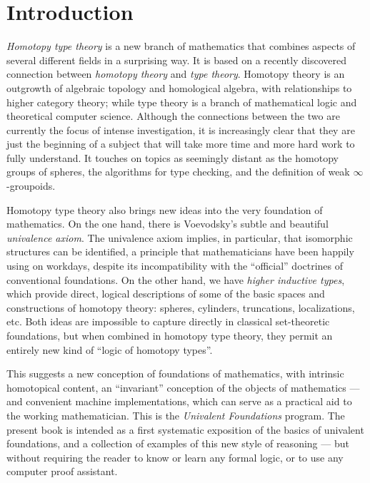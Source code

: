 \chapter*{Introduction}
\setcounter{page}{1}


\emph{Homotopy type theory} is a new branch of mathematics that combines aspects of several different fields in a surprising way. It is based on a recently discovered connection between \emph{homotopy theory} and \emph{type theory}.
Homotopy theory is an outgrowth of algebraic topology and homological algebra, with relationships to higher category theory; while type theory is a branch of mathematical logic and theoretical computer science.
Although the connections between the two are currently the focus of intense investigation, it is increasingly clear that they are just the beginning of a subject that will take more time and more hard work to fully understand.
It touches on topics as seemingly distant as the homotopy groups of spheres, the algorithms for type checking, and the definition of weak $\infty$-groupoids.

Homotopy type theory also brings new ideas into the very foundation of mathematics.
On the one hand, there is Voevodsky's subtle and beautiful \emph{univalence axiom}.
The univalence axiom implies, in particular, that isomorphic structures can be identified, a principle that mathematicians have been happily using on workdays, despite its incompatibility with the ``official'' doctrines of conventional foundations.
On the other hand, we have \emph{higher inductive types}, which provide direct, logical descriptions of some of the basic spaces and constructions of homotopy theory: spheres, cylinders, truncations, localizations, etc.
Both ideas are impossible to capture directly in classical set-theoretic foundations, but when combined in homotopy type theory, they permit an entirely new kind of ``logic of homotopy types''.

This suggests a new conception of foundations of mathematics, with intrinsic homotopical content, an ``invariant'' conception of the objects of mathematics --- and convenient machine implementations, which can serve as a practical aid to the working mathematician.
This is the \emph{Univalent Foundations} program.
The present book is intended as a first systematic exposition of the basics of univalent foundations, and a collection of examples of this new style of reasoning --- but without requiring the reader to know or learn any formal logic, or to use any computer proof assistant.


